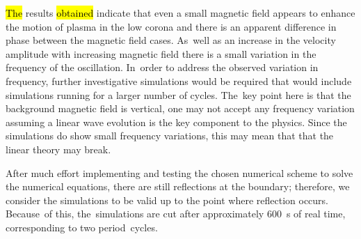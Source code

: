 \documentclass[physics,article,accept,pdftex,moreauthors]{Definitions/mdpi}
\begin{document}
 \hl{The} 
 results \hl{obtained} 
indicate that even a small magnetic field appears to enhance the motion of plasma in the low corona and  there is an apparent difference in phase between the magnetic field cases. As~well as an increase in the velocity amplitude with increasing magnetic field there is a small variation in the frequency of the oscillation. In~order to address  the observed variation in frequency, further investigative simulations would be required  that would include simulations running for a larger number of cycles.  The~key point here is that the background magnetic field is vertical, one may not accept any frequency variation assuming a linear wave evolution is the key component to the physics. Since the simulations do show small frequency variations, this may mean that that the linear theory may break.
  





After much  effort implementing and testing  the chosen numerical scheme to solve the numerical equations, there are still reflections at the boundary; therefore, we consider the simulations to be valid up to the point where reflection occurs. Because~of this, the~simulations are cut after approximately 600~s of real time, corresponding to two period~cycles.
\end{document}
